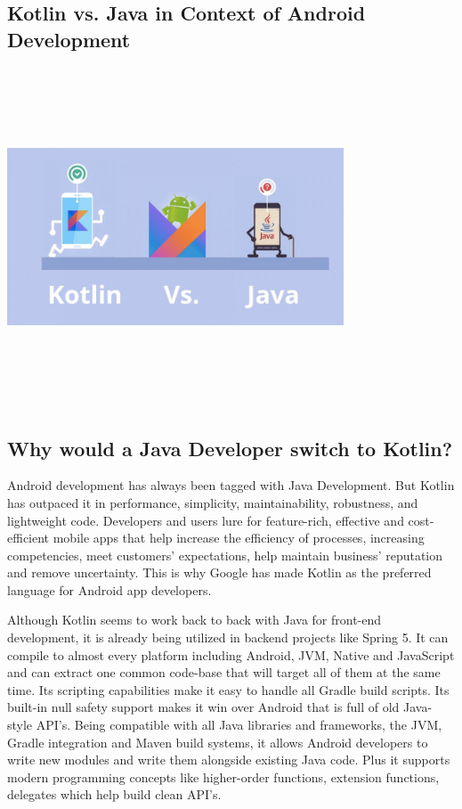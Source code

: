 \subsection{Kotlin vs. Java in Context of Android Development}
\par
\medskip
\begin{center}
    \includegraphics[width=10cm,height=10cm,keepaspectratio]{Images/KotlinvJava.jpg}
\end{center}

\subsection{Why would a Java Developer switch to Kotlin?}
Android development has always been tagged with Java Development. But Kotlin has outpaced it in performance, simplicity, maintainability, robustness, and lightweight code. Developers and users lure for feature-rich, effective and cost-efficient mobile apps that help increase the efficiency of processes, increasing competencies, meet customers’ expectations, help maintain business’ reputation and remove uncertainty. This is why Google has made Kotlin as the preferred language for Android app developers.\newline

Although Kotlin seems to work back to back with Java for front-end development, it is already being utilized in backend projects like Spring 5. It can compile to almost every platform including Android, JVM, Native and JavaScript and can extract one common code-base that will target all of them at the same time. Its scripting capabilities make it easy to handle all Gradle build scripts. Its built-in null safety support makes it win over Android that is full of old Java-style API’s. Being compatible with all Java libraries and frameworks, the JVM, Gradle integration and Maven build systems, it allows Android developers to write new modules and write them alongside existing Java code. Plus it supports modern programming concepts like higher-order functions, extension functions, delegates which help build clean API’s.
\newpage

